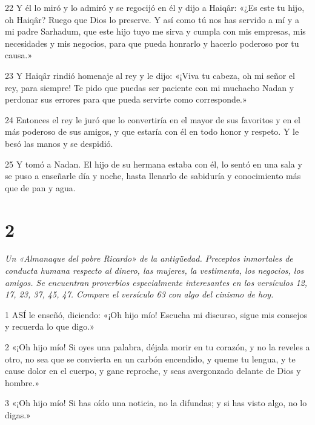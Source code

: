 \par 22 Y él lo miró y lo admiró y se regocijó en él y dijo a Haiqâr: «¿Es este tu hijo, oh Haiqâr? Ruego que Dios lo preserve. Y así como tú nos has servido a mí y a mi padre Sarhadum, que este hijo tuyo me sirva y cumpla con mis empresas, mis necesidades y mis negocios, para que pueda honrarlo y hacerlo poderoso por tu causa.»

\par 23 Y Haiqâr rindió homenaje al rey y le dijo: «¡Viva tu cabeza, oh mi señor el rey, para siempre! Te pido que puedas ser paciente con mi muchacho Nadan y perdonar sus errores para que pueda servirte como corresponde.»

\par 24 Entonces el rey le juró que lo convertiría en el mayor de sus favoritos y en el más poderoso de sus amigos, y que estaría con él en todo honor y respeto. Y le besó las manos y se despidió.

\par 25 Y tomó a Nadan. El hijo de su hermana estaba con él, lo sentó en una sala y se puso a enseñarle día y noche, hasta llenarlo de sabiduría y conocimiento más que de pan y agua.



\chapter{2}

\par \textit{Un «Almanaque del pobre Ricardo» de la antigüedad. Preceptos inmortales de conducta humana respecto al dinero, las mujeres, la vestimenta, los negocios, los amigos. Se encuentran proverbios especialmente interesantes en los versículos 12, 17, 23, 37, 45, 47. Compare el versículo 63 con algo del cinismo de hoy.}

\par 1 ASÍ le enseñó, diciendo: «¡Oh hijo mío! Escucha mi discurso, sigue mis consejos y recuerda lo que digo.»

\par 2 «¡Oh hijo mío! Si oyes una palabra, déjala morir en tu corazón, y no la reveles a otro, no sea que se convierta en un carbón encendido, y queme tu lengua, y te cause dolor en el cuerpo, y gane reproche, y seas avergonzado delante de Dios y hombre.»

\par 3 «¡Oh hijo mío! Si has oído una noticia, no la difundas; y si has visto algo, no lo digas.»

